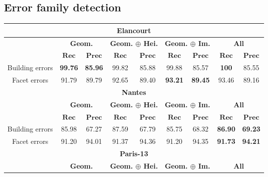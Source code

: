    \subsection{Error family detection}
        \label{subsec::more_experiments::finesse::2}
        \begin{table}[htbp]
            \footnotesize
            \centering
            \begin{tabular}{|c | c c | c c | c c | c c |}
                \hline
                \multicolumn{9}{|c|}{\textbf{Elancourt}}\\
                \hline
                &\multicolumn{2}{c|}{\textbf{Geom.}} & \multicolumn{2}{c|}{\textbf{Geom. \(\oplus\) Hei.}} & \multicolumn{2}{c|}{\textbf{Geom. \(\oplus\) Im.}} & \multicolumn{2}{x{1.8cm}|}{\textbf{All}}\\
                \cline{2-9}
                & \(\bm{Rec}\) & \(\bm{Prec}\) &  \(\bm{Rec}\) & \(\bm{Prec}\) &  \(\bm{Rec}\) & \(\bm{Prec}\) &  \(\bm{Rec}\) & \(\bm{Prec}\) \\
                \hline
                Building errors & \textbf{99.76} & \textbf{85.96} & 99.82 & 85.88 & 99.88 & 85.57 & \textbf{100} & 85.55 \\
                \hline
                Facet errors & 91.79 & 89.79 & 92.65 & 89.40 & \textbf{93.21} & \textbf{89.45} & 93.46 & 89.16 \\
                \hline
                \hline
                \multicolumn{9}{|c|}{\textbf{Nantes}}\\
                \hline
                &\multicolumn{2}{c|}{\textbf{Geom.}} & \multicolumn{2}{c|}{\textbf{Geom. \(\oplus\) Hei.}} & \multicolumn{2}{c|}{\textbf{Geom. \(\oplus\) Im.}} & \multicolumn{2}{x{1.8cm}|}{\textbf{All}}\\
                \cline{2-9}
                & \(\bm{Rec}\) & \(\bm{Prec}\) &  \(\bm{Rec}\) & \(\bm{Prec}\) &  \(\bm{Rec}\) & \(\bm{Prec}\) &  \(\bm{Rec}\) & \(\bm{Prec}\) \\
                \hline
                Building errors & 85.98 & 67.27 & 87.59 & 67.79 & 85.75 & 68.32 & \textbf{86.90} & \textbf{69.23} \\
                \hline
                Facet errors & 91.20 & 94.01 & 91.37 & 94.36 & 91.20 & 94.35 & \textbf{91.73} & \textbf{94.21}\\
                \hline
                \hline
                \multicolumn{9}{|c|}{\textbf{Paris-13}}\\
                \hline
                &\multicolumn{2}{c|}{\textbf{Geom.}} & \multicolumn{2}{c|}{\textbf{Geom. \(\oplus\) Hei.}} & \multicolumn{2}{c|}{\textbf{Geom. \(\oplus\) Im.}} & \multicolumn{2}{x{1.8cm}|}{\textbf{All}}\\

\end{tabular}
\end{table}
